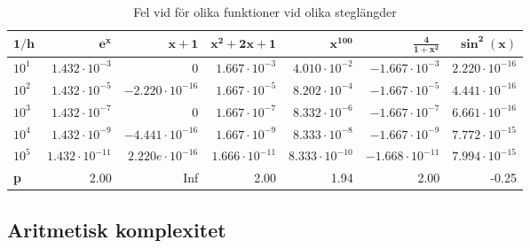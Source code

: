 \documentclass[a4paper,titlepage]{article}
\begin{document}
\begin{table}[h]
    \begin{tabular}{l | r | r | r | r | r | r}
        $\mathbf{1/h}$ & $\mathbf{e^x}$ & $\mathbf{x + 1}$ & $\mathbf{x^2 + 2x + 1}$ & $\mathbf{x^{100}}$ & $\mathbf{\frac{4}{1 + x^2}}$ & $\mathbf{\sin^2(x)}$ \\ \hline
        $10^1$         & $1.432 \cdot 10^{-3}$ & $0                    $  & $1.667 \cdot 10^{-3}  $ & $4.010 \cdot 10^{-2} $ & $-1.667 \cdot 10^{-3}$ & $2.220 \cdot 10^{-16}$ \\
        $10^2$         & $1.432 \cdot 10^{-5}$ & $-2.220 \cdot 10^{-16}$  & $1.667 \cdot 10^{-5} $ & $8.202 \cdot 10^{-4} $ & $-1.667 \cdot 10^{-5}$ & $4.441 \cdot 10^{-16}$ \\
        $10^3$         & $1.432 \cdot 10^{-7}$ & $0                    $  & $1.667 \cdot 10^{-7}  $ & $8.332 \cdot 10^{-6} $ & $-1.667 \cdot 10^{-7}$ & $6.661 \cdot 10^{-16}$ \\
        $10^4$         & $1.432 \cdot 10^{-9}$ & $-4.441 \cdot 10^{-16}$  & $1.667 \cdot 10^{-9} $ & $8.333 \cdot 10^{-8} $ & $-1.667 \cdot 10^{-9}$ & $7.772 \cdot 10^{-15}$ \\
        $10^5$         & $1.432 \cdot 10^{-11}$ & $2.220e \cdot 10^{-16}$  & $1.666 \cdot 10^{-11}$ & $8.333 \cdot 10^{-10}$ & $-1.668 \cdot 10^{-11}$ & $7.994 \cdot 10^{-15}$ \\ \hline
        \textbf{p}     & 2.00                   & Inf                      & 2.00                   & 1.94                   & 2.00                    & -0.25 \\
    \end{tabular}
    \caption{Fel vid för olika funktioner vid olika steglängder}
    \label{tab:errors}
\end{table}


\subsection{Aritmetisk komplexitet}
\end{document}
